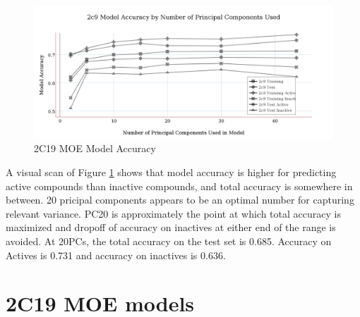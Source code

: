 \begin{figure}[H]
\includegraphics[width=1\textwidth]{../img/2c9_moe_model_accuracy.png}
\caption{2C19 MOE Model Accuracy}
\label{fig:2c9}
\end{figure}

A visual scan of Figure \ref{fig:2c9} shows that model accuracy is higher for predicting active compounds than inactive compounds, and total accuracy is somewhere in between. 20 pricipal components appears to be an optimal number for capturing relevant variance.
PC20 is approximately the point at which total accuracy is maximized and dropoff of accuracy on inactives at either end of the range is avoided.
At 20PCs, the total accuracy on the test set is 0.685. Accuracy on Actives is 0.731 and accuracy on inactives is 0.636.


\section{2C19 MOE models}

